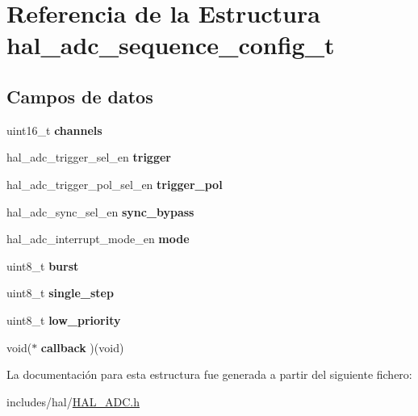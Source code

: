 \hypertarget{structhal__adc__sequence__config__t}{}\section{Referencia de la Estructura hal\+\_\+adc\+\_\+sequence\+\_\+config\+\_\+t}
\label{structhal__adc__sequence__config__t}
\subsection*{Campos de datos}
\begin{DoxyCompactItemize}
\item 
\mbox{\label{structhal__adc__sequence__config__t_acebe3f0fdc69a72787ddd6b19870641b}} 
uint16\+\_\+t {\bfseries channels}
\item 
\mbox{\label{structhal__adc__sequence__config__t_a6bcb45974cab7522fa8fddd79fa7f1e1}} 
hal\+\_\+adc\+\_\+trigger\+\_\+sel\+\_\+en {\bfseries trigger}
\item 
\mbox{\label{structhal__adc__sequence__config__t_a0e3bc5f0a78cf105554a67af8f34d383}} 
hal\+\_\+adc\+\_\+trigger\+\_\+pol\+\_\+sel\+\_\+en {\bfseries trigger\+\_\+pol}
\item 
\mbox{\label{structhal__adc__sequence__config__t_a97da414f66a2d3643c7a9cf9ff6f64d2}} 
hal\+\_\+adc\+\_\+sync\+\_\+sel\+\_\+en {\bfseries sync\+\_\+bypass}
\item 
\mbox{\label{structhal__adc__sequence__config__t_adea8d61d74a67ea1d2da046c57f30590}} 
hal\+\_\+adc\+\_\+interrupt\+\_\+mode\+\_\+en {\bfseries mode}
\item 
\mbox{\label{structhal__adc__sequence__config__t_afe2931739ce28ec41475885a46fdc910}} 
uint8\+\_\+t {\bfseries burst}
\item 
\mbox{\label{structhal__adc__sequence__config__t_ac70813667637a3ee24db9f7f2606d87b}} 
uint8\+\_\+t {\bfseries single\+\_\+step}
\item 
\mbox{\label{structhal__adc__sequence__config__t_a1dc8fcb4920ed109389a6391e8c1c9ef}} 
uint8\+\_\+t {\bfseries low\+\_\+priority}
\item 
\mbox{\label{structhal__adc__sequence__config__t_a42710517a48ebba1b95e66e9f005cf7d}} 
void($\ast$ {\bfseries callback} )(void)
\end{DoxyCompactItemize}


La documentación para esta estructura fue generada a partir del siguiente fichero\+:\begin{DoxyCompactItemize}
\item 
includes/hal/\hyperlink{HAL__ADC_8h}{H\+A\+L\+\_\+\+A\+D\+C.\+h}\end{DoxyCompactItemize}
